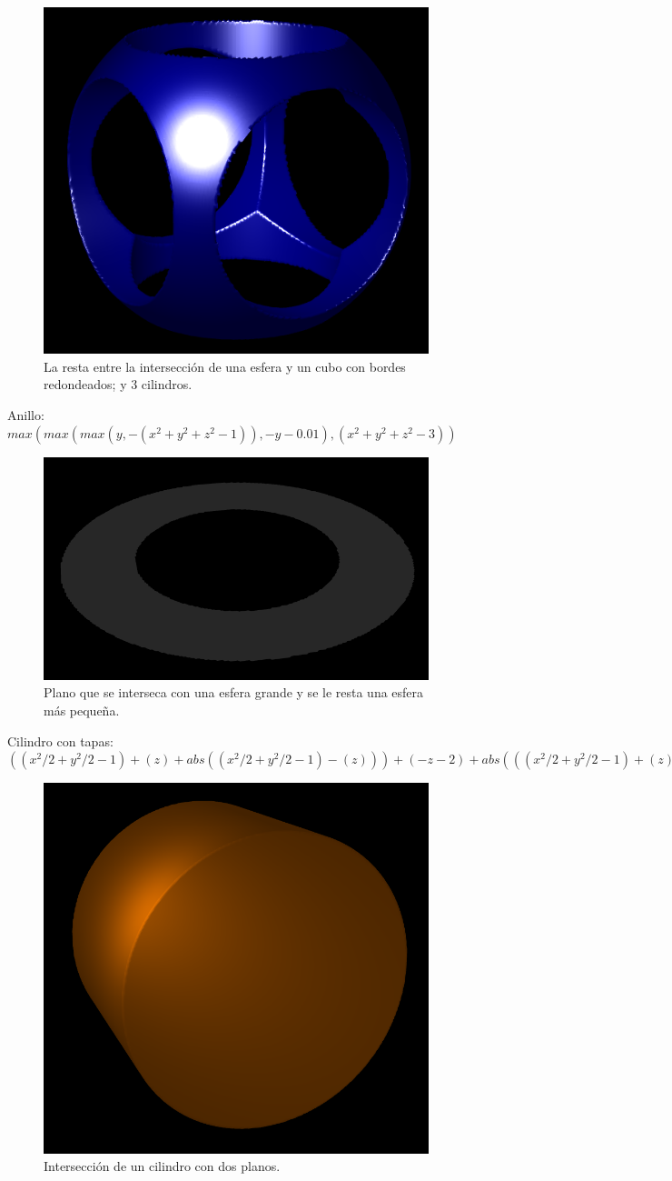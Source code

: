 \documentclass[12pt]{article}
\begin{document}
\begin{figure}[h!]
\includegraphics[width=0.7\linewidth,center]{g2.png}
\caption{La resta entre la intersección de una esfera y un cubo con bordes redondeados; y 3 cilindros.}
\end{figure}
\clearpage
Anillo: $max(max(max(y,- (x^2 + y^2 + z^2-1)), -y- 0.01), (x^2 +y^2 +z^2 - 3))$ \\
\begin{figure}[h!]
\includegraphics[width=0.7\linewidth,center]{g3.png}
\caption{Plano que se interseca con una esfera grande y se le resta una esfera más pequeña.}
\end{figure}
\clearpage
Cilindro con tapas: $((x^2/2 + y^2/2 - 1) + (z) + abs((x^2/2 + y^2/2 - 1)-(z)))+(-z-2)+abs(((x^2/2 + y^2/2 - 1) + (z) + abs((x^2/2 + y^2/2 - 1)-(z)))-(-z-2))$ \\
\begin{figure}[h!]
\includegraphics[width=0.7\linewidth,center]{g4.png}
\caption{Intersección de un cilindro con dos planos.}
\end{figure}
\end{document}
